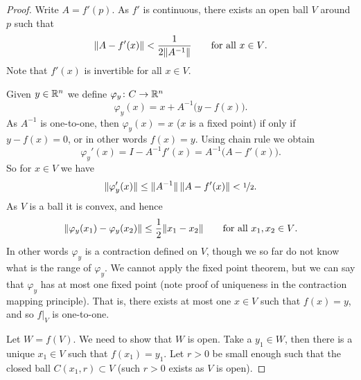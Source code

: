 \begin{proof}
Write $A = f'(p)$.  As $f'$ is continuous, there exists an open ball
$V$ around $p$ such that
\begin{equation*}
\lVert {A-f'(x)} \rVert < \frac{1}{2\lVert {A^{-1}} \rVert}
\qquad \text{for all $x \in V$.}
\end{equation*}
Note that $f'(x)$ is invertible for all $x \in V$.

Given $y \in {\mathbb{R}}^n$ we define $\varphi_y \colon C \to {\mathbb{R}}^n$
\begin{equation*}
\varphi_y (x) = x + A^{-1}\bigl(y-f(x)\bigr) .
\end{equation*}
As $A^{-1}$ is one-to-one,
then $\varphi_y(x) = x$ ($x$ is a fixed point) if only if
$y-f(x) = 0$, or in other words $f(x)=y$.  Using chain rule we obtain
\begin{equation*}
\varphi_y'(x) = I - A^{-1} f'(x) = A^{-1} \bigl( A-f'(x) \bigr) .
\end{equation*}
So for $x \in V$ we have
\begin{equation*}
\lVert {\varphi_y'(x)} \rVert \leq \lVert {A^{-1}} \rVert \, \lVert {A-f'(x)} \rVert < \nicefrac{1}{2} .
\end{equation*}
As $V$ is a ball it is convex, and hence
\begin{equation*}
\lVert {\varphi_y(x_1)-\varphi_y(x_2)} \rVert \leq \frac{1}{2} \lVert {x_1-x_2} \rVert 
\qquad
\text{for all $x_1,x_2 \in V$}.
\end{equation*}
In other words $\varphi_y$ is a contraction defined on $V$, though we so far
do not know what is the range of $\varphi_y$.  We cannot apply the fixed
point theorem, but we can say that $\varphi_y$ 
has at most one fixed point (note proof of uniqueness in the contraction
mapping principle).  That is, there exists at most one $x \in V$
such that $f(x) = y$, and so $f|_V$ is one-to-one.

Let $W = f(V)$.  We need to show that $W$ is open.  Take a $y_1 \in W$,
then there is a unique $x_1 \in V$ such that $f(x_1) = y_1$.
Let $r > 0$ be small enough such that the closed ball $C(x_1,r) \subset V$
(such $r > 0$ exists as $V$ is open).


\end{proof}
